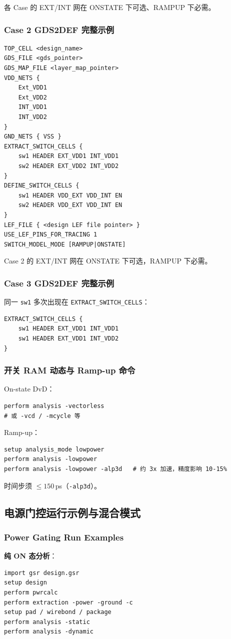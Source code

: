 各 Case 的 EXT/INT 网在 ONSTATE 下可选、RAMPUP 下必需。
\subsubsection{Case 2 GDS2DEF 完整示例}
\begin{lstlisting}
TOP_CELL <design_name>
GDS_FILE <gds_pointer>
GDS_MAP_FILE <layer_map_pointer>
VDD_NETS {
    Ext_VDD1
    Ext_VDD2
    INT_VDD1
    INT_VDD2
}
GND_NETS { VSS }
EXTRACT_SWITCH_CELLS {
    sw1 HEADER EXT_VDD1 INT_VDD1
    sw2 HEADER EXT_VDD2 INT_VDD2
}
DEFINE_SWITCH_CELLS {
    sw1 HEADER VDD_EXT VDD_INT EN
    sw2 HEADER VDD_EXT VDD_INT EN
}
LEF_FILE { <design LEF file pointer> }
USE_LEF_PINS_FOR_TRACING 1
SWITCH_MODEL_MODE [RAMPUP|ONSTATE]
\end{lstlisting}
Case 2 的 EXT/INT 网在 ONSTATE 下可选，RAMPUP 下必需。

\subsubsection{Case 3 GDS2DEF 完整示例}
同一 \texttt{sw1} 多次出现在 \texttt{EXTRACT\_SWITCH\_CELLS}：
\begin{lstlisting}
EXTRACT_SWITCH_CELLS {
    sw1 HEADER EXT_VDD1 INT_VDD1
    sw1 HEADER EXT_VDD1 INT_VDD2
}
\end{lstlisting}

\subsubsection{开关 RAM 动态与 Ramp-up 命令}
On-state DvD：
\begin{lstlisting}
perform analysis -vectorless
# 或 -vcd / -mcycle 等
\end{lstlisting}
Ramp-up：
\begin{lstlisting}
setup analysis_mode lowpower
perform analysis -lowpower
perform analysis -lowpower -alp3d   # 约 3x 加速，精度影响 10-15%
\end{lstlisting}
时间步须 $\le 150$\,ps（\texttt{-alp3d}）。

\subsection{电源门控运行示例与混合模式}
\subsubsection*{Power Gating Run Examples}

\textbf{纯 ON 态分析}：
\begin{lstlisting}
import gsr design.gsr
setup design
perform pwrcalc
perform extraction -power -ground -c
setup pad / wirebond / package
perform analysis -static
perform analysis -dynamic
\end{lstlisting}

